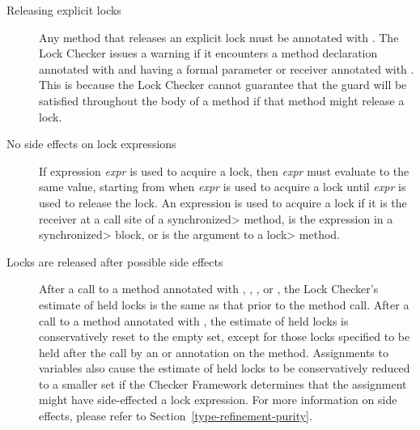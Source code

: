 \begin{description}

\item[Releasing explicit locks]
  Any method that releases an explicit lock must be annotated
  with .
  The Lock Checker issues a warning if it encounters a method declaration
  annotated with  and having a formal parameter
  or receiver annotated with .  This is because
  the Lock Checker cannot guarantee that the guard will be satisfied
  throughout the body of a method if that method might release a lock.

\item[No side effects on lock expressions]
  If expression \emph{expr} is used to acquire a lock, then
  \emph{expr} must evaluate to the same value, starting from when
  \emph{expr} is used to acquire a lock until \emph{expr} is used to
  release the lock.
  An expression is used to acquire a lock if it is the receiver at a
  call site of a \<synchronized> method, is the expression in a
  \<synchronized> block, or is the argument to a \<lock> method.

\item[Locks are released after possible side effects]
  After a call to a method annotated with ,
  , , or ,
  the Lock Checker's estimate of held locks
  is the same as that prior to the method call.
  After a call to a method annotated with ,
  the estimate of held locks is conservatively reset to the empty set,
  except for those locks specified to be held after the call
  by an  or 
  annotation on the method.  Assignments to variables also
  cause the estimate of held locks to be conservatively reduced
  to a smaller set if the Checker Framework determines that the
  assignment might have side-effected a lock expression.
  For more information on side effects, please refer to
  Section~\ref{type-refinement-purity}.

\end{description}



